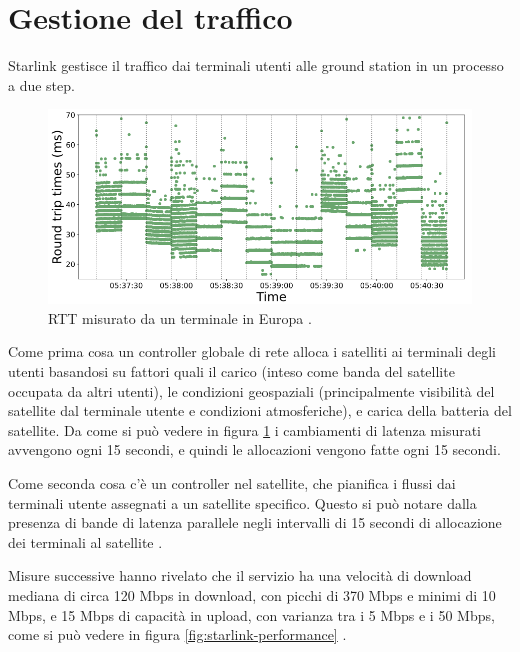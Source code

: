 \section{Gestione del traffico}
Starlink gestisce il traffico dai terminali utenti alle ground station in un processo a due step.

\begin{figure}[htbp]
  \centering
  \includegraphics[width=0.8\linewidth]{./res/img/rtt_euterminal.png}
  \caption{\ac{RTT} misurato da un terminale in Europa \cite{tanveer_making_2023}.}
  \label{fig:rtt-euterminal}
\end{figure}

Come prima cosa un controller globale di rete alloca i satelliti ai terminali degli utenti basandosi su fattori quali il carico (inteso come banda del satellite occupata da altri utenti), le condizioni geospaziali (principalmente visibilità del satellite dal terminale utente e condizioni atmosferiche), e carica della batteria del satellite.
Da come si può vedere in figura \ref{fig:rtt-euterminal} i cambiamenti di latenza misurati avvengono ogni 15 secondi, e quindi le allocazioni vengono fatte ogni 15 secondi.

Come seconda cosa c'è un controller nel satellite, che pianifica i flussi dai terminali utente assegnati a un satellite specifico.
Questo si può notare dalla presenza di bande di latenza parallele negli intervalli di 15 secondi di allocazione dei terminali al satellite \cite{tanveer_making_2023} \cite{geoff_huston_transport_2024}.

Misure successive hanno rivelato che il servizio ha una velocità di download mediana di circa 120 Mbps in download, con picchi di 370 Mbps e minimi di 10 Mbps, e 15 Mbps di capacità in upload, con varianza tra i 5 Mbps e i 50 Mbps, come si può vedere in figura \ref{fig:starlink-performance} \cite{geoff_huston_transport_2024}.

